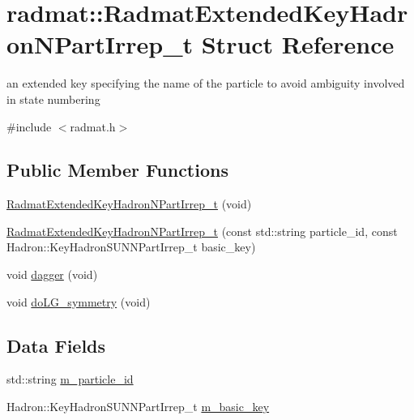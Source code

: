 \hypertarget{structradmat_1_1RadmatExtendedKeyHadronNPartIrrep__t}{}\section{radmat\+:\+:Radmat\+Extended\+Key\+Hadron\+N\+Part\+Irrep\+\_\+t Struct Reference}
\label{structradmat_1_1RadmatExtendedKeyHadronNPartIrrep__t}


an extended key specifying the name of the particle to avoid ambiguity involved in state numbering  




{\ttfamily \#include $<$radmat.\+h$>$}

\subsection*{Public Member Functions}
\begin{DoxyCompactItemize}
\item 
\mbox{\hyperlink{structradmat_1_1RadmatExtendedKeyHadronNPartIrrep__t_a4f78f037045eee481ceb3c0c3bb886d6}{Radmat\+Extended\+Key\+Hadron\+N\+Part\+Irrep\+\_\+t}} (void)
\item 
\mbox{\hyperlink{structradmat_1_1RadmatExtendedKeyHadronNPartIrrep__t_a383591bde9a9d08d67dd1176f338e291}{Radmat\+Extended\+Key\+Hadron\+N\+Part\+Irrep\+\_\+t}} (const std\+::string particle\+\_\+id, const Hadron\+::\+Key\+Hadron\+S\+U\+N\+N\+Part\+Irrep\+\_\+t basic\+\_\+key)
\item 
void \mbox{\hyperlink{structradmat_1_1RadmatExtendedKeyHadronNPartIrrep__t_a853c8c23379fe19ef3b56ae74c49f4ae}{dagger}} (void)
\item 
void \mbox{\hyperlink{structradmat_1_1RadmatExtendedKeyHadronNPartIrrep__t_ac8e36ce1234f50aecb13e22205e6d271}{do\+L\+G\+\_\+symmetry}} (void)
\end{DoxyCompactItemize}
\subsection*{Data Fields}
\begin{DoxyCompactItemize}
\item 
std\+::string \mbox{\hyperlink{structradmat_1_1RadmatExtendedKeyHadronNPartIrrep__t_ad3d2dc1dd2234335c468e32c4b3eeb85}{m\+\_\+particle\+\_\+id}}
\item 
Hadron\+::\+Key\+Hadron\+S\+U\+N\+N\+Part\+Irrep\+\_\+t \mbox{\hyperlink{structradmat_1_1RadmatExtendedKeyHadronNPartIrrep__t_a87946ef409921c2b08548d9f8ec3e89a}{m\+\_\+basic\+\_\+key}}
\end{DoxyCompactItemize}


